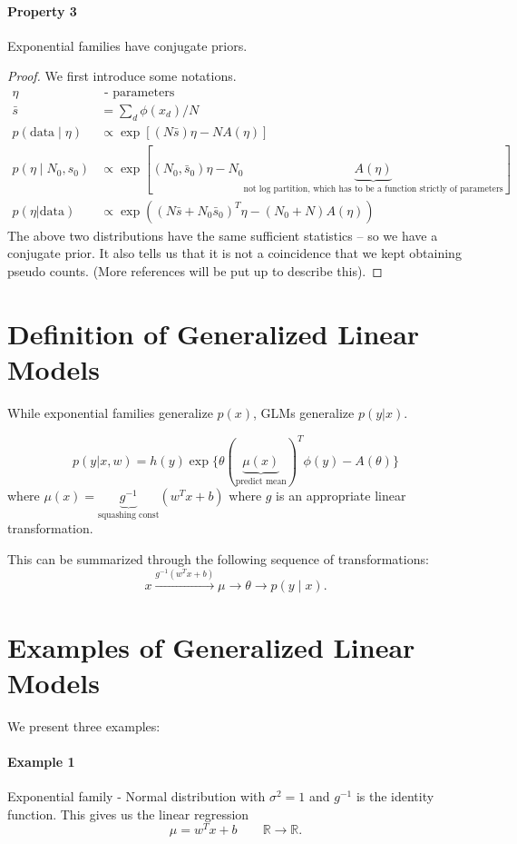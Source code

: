 \documentclass{article}
\begin{document}
\paragraph{Property 3} Exponential families have conjugate priors.

\begin{proof}
We first introduce some notations. 
\begin{align*}
\eta &\text{ - parameters}
\\
\bar{s} &= \sum_d\phi(x_d) / N
\\
p(\text{data} \mid \eta) &\propto \exp [(N \bar s) \eta - N A(\eta)]
\\
p(\eta \mid N_0, s_0) &\propto \exp[ (N_0, \bar s_0) \eta - N_0 \underbrace{A(\eta)}_{\text{not log partition, which has to be a function strictly of parameters}}]
\\
p(\eta | \text{data}) &\propto \exp((N\bar{s} + N_0\bar{s}_0)^T\eta - (N_0 + N)A(\eta))
\end{align*}
The above two distributions have the same sufficient statistics -- so we have a conjugate prior. It also tells us that it is not a coincidence that we kept obtaining pseudo counts. (More references will be put up to describe this). 

\end{proof}

\section{Definition of Generalized Linear Models}

While exponential families generalize $p(x)$, GLMs generalize $p(y|x)$.

\[
p(y | x,w) = h(y)\exp\{\theta(\underbrace{\mu(x)}_{\text{predict mean}})^T\phi(y) - A(\theta)\}
\]
where $\mu(x) = \underbrace{g^{-1}}_{\text{squashing const}}(w^Tx + b)$
where $g$ is an appropriate linear transformation.

This can be summarized through the following sequence of transformations:
$$
x \overset{g^{-1}(w^T x + b)}{\longrightarrow} \mu \to \theta \to p(y \mid x).
$$

\section{Examples of Generalized Linear Models}
We present three examples:
\paragraph{Example 1} Exponential family - Normal distribution with $\sigma^2 = 1$ and $g^{-1}$ is the identity function.
This gives us the linear regression
$$
\mu = w^Tx + b \qquad \mathbb{R} \to \mathbb{R}.
$$
\end{document}
